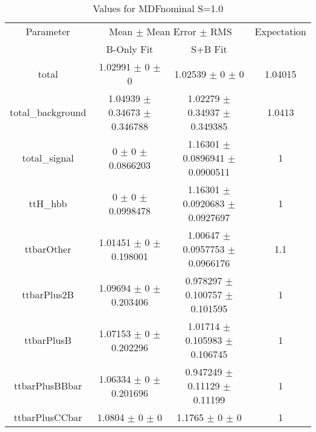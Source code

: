 \begin{table}
\centering
\caption{Values for MDFnominal S=1.0}
\begin{tabular}{cccc}
\toprule
Parameter & \multicolumn{2}{c}{Mean $\pm$ Mean Error $\pm$ RMS} & Expectation\\
 & B-Only Fit & S+B Fit & \\
\midrule
total & \num{1.02991} $\pm$ \num{0} $\pm$ \num{0} & \num{1.02539} $\pm$ \num{0} $\pm$ \num{0} & \num{1.04015}\\
total\_background & \num{1.04939} $\pm$ \num{0.34673} $\pm$ \num{0.346788} & \num{1.02279} $\pm$ \num{0.34937} $\pm$ \num{0.349385} & \num{1.0413}\\
total\_signal & \num{0} $\pm$ \num{0} $\pm$ \num{0.0866203} & \num{1.16301} $\pm$ \num{0.0896941} $\pm$ \num{0.0900511} & \num{1}\\
ttH\_hbb & \num{0} $\pm$ \num{0} $\pm$ \num{0.0998478} & \num{1.16301} $\pm$ \num{0.0920683} $\pm$ \num{0.0927697} & \num{1}\\
ttbarOther & \num{1.01451} $\pm$ \num{0} $\pm$ \num{0.198001} & \num{1.00647} $\pm$ \num{0.0957753} $\pm$ \num{0.0966176} & \num{1.1}\\
ttbarPlus2B & \num{1.09694} $\pm$ \num{0} $\pm$ \num{0.203406} & \num{0.978297} $\pm$ \num{0.100757} $\pm$ \num{0.101595} & \num{1}\\
ttbarPlusB & \num{1.07153} $\pm$ \num{0} $\pm$ \num{0.202296} & \num{1.01714} $\pm$ \num{0.105983} $\pm$ \num{0.106745} & \num{1}\\
ttbarPlusBBbar & \num{1.06334} $\pm$ \num{0} $\pm$ \num{0.201696} & \num{0.947249} $\pm$ \num{0.11129} $\pm$ \num{0.11199} & \num{1}\\
ttbarPlusCCbar & \num{1.0804} $\pm$ \num{0} $\pm$ \num{0} & \num{1.1765} $\pm$ \num{0} $\pm$ \num{0} & \num{1}\\
\bottomrule
\end{tabular}
\end{table}